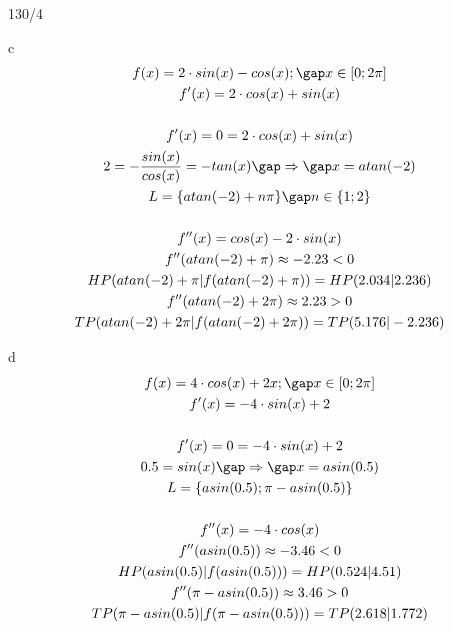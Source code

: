 \newpage
\begin{exercise}{130/4}
  \item [c]
  \begin{gather*}
    f(x) = 2 \cdot sin(x) - cos(x); \gap x \in \left[0; 2\pi\right] \\
    f'(x) = 2 \cdot cos(x) + sin(x) \\\\
    f'(x) = 0 = 2 \cdot cos(x) + sin(x) \\
    2 = -\frac{sin(x)}{cos(x)} = -tan(x) \gap\Rightarrow\gap x = atan(-2) \\
    L = \{atan(-2) + n\pi\} \gap n \in \{1; 2\} \\\\
    f''(x) = cos(x) - 2 \cdot sin(x) \\
    f''(atan(-2) + \pi) \approx -2.23 < 0 \\
    HP(atan(-2) + \pi|f(atan(-2) + \pi)) = HP(2.034|2.236) \\
    f''(atan(-2) + 2\pi) \approx 2.23 > 0 \\
    TP(atan(-2) + 2\pi|f(atan(-2) + 2\pi)) = TP(5.176|-2.236)
  \end{gather*}
  \item [d]
  \begin{gather*}
    f(x) = 4 \cdot cos(x) + 2x; \gap x \in \left[0; 2\pi\right] \\
    f'(x) = -4 \cdot sin(x) + 2 \\\\
    f'(x) = 0 = -4 \cdot sin(x) + 2 \\
    0.5 = sin(x) \gap\Rightarrow\gap x = asin(0.5) \\
    L = \{asin(0.5); \pi - asin(0.5)\} \\\\
    f''(x) = -4 \cdot cos(x) \\
    f''(asin(0.5)) \approx -3.46 < 0 \\
    HP(asin(0.5)|f(asin(0.5))) = HP(0.524|4.51) \\
    f''(\pi - asin(0.5)) \approx 3.46 > 0 \\
    TP(\pi - asin(0.5)|f(\pi - asin(0.5))) = TP(2.618|1.772)
  \end{gather*}
\end{exercise}
